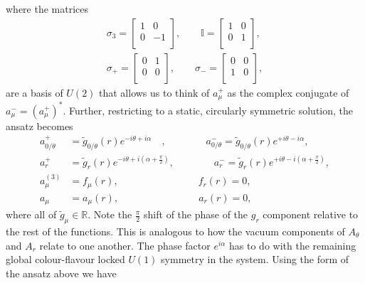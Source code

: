     where the matrices
    \begin{align}
        \sigma_3 = \begin{bmatrix}
            1 & 0 \\
            0 & -1 \\
        \end{bmatrix}, \qquad \mathbb{I}= \begin{bmatrix}
            1 & 0\\
            0 & 1\\
        \end{bmatrix}, \\
        \sigma_+ =\begin{bmatrix}
            0 & 1\\
            0 & 0\\
        \end{bmatrix}, \qquad \sigma_- = \begin{bmatrix}
            0 &0\\
            1 &0\\
        \end{bmatrix},
    \end{align}
    are a basis of $U(2)$ that allows us to think of $a_{\mu}^{+}$ as the complex conjugate of $a_{\mu}^{-}= (a_{\mu}^{+})^*$. Further, restricting to a static, circularly symmetric solution, the ansatz becomes
\begin{align}
    a_{0/\theta}^{+} &= \tilde{g}_{0/\theta}(r)e^{-i \theta + i\alpha}\quad, \qquad \qquad a_{0/\theta}^{-} = \tilde{g}_{0/\theta}(r)e^{+i \theta - i\alpha}, \label{eq:U2_gauge_ansatz_static_1}\\
    a_{r}^{+} &= \tilde{g}_{r}(r)e^{-i \theta + i\left(\alpha + \frac{\pi}{2} \right)}, \qquad \qquad a_{r}^{-} = \tilde{g}_{r}(r)e^{+i \theta - i\left(\alpha + \frac{\pi}{2} \right)}, \label{eq:U2_gauge_ansatz_static_2}\\
    a_{\mu}^{(3)}&= f_{\mu}(r),\qquad \qquad \qquad \qquad f_r(r)=0, \label{eq:U2_gauge_ansatz_static_3}\\
    a_{\mu}&= a_{\mu}(r),\qquad \qquad \qquad \qquad a_r(r)=0\label{eq:U2_gauge_ansatz_static_4},
\end{align}
where all of $\tilde{g}_{\mu} \in \mathbb{R}$. Note the $\frac{\pi}{2}$ shift of the phase of the $g_r$ component relative to the rest of the functions. This is analogous to how the vacuum components of $A_{\theta}$ and $A_r$ relate to one another. The phase factor $e^{i \alpha}$ has to do with the remaining global colour-flavour locked $U(1)$ symmetry in the system. Using the form of the ansatz above we have
